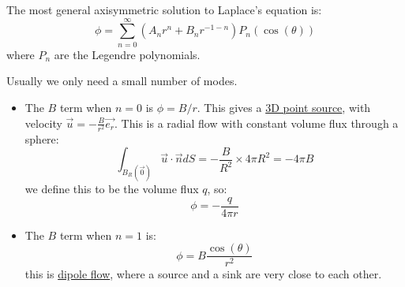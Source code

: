 \documentclass[../Main.tex]{subfiles}
\begin{document}
\begin{example}
    The most general axisymmetric solution to Laplace's equation is:
    \begin{equation*}
        \phi = \sum_{n=0}^{\infty} \left(A_n r^n + B_n r^{-1-n}\right) P_n(\cos(\theta))
    \end{equation*}
    where $P_n$ are the Legendre polynomials.

    Usually we only need a small number of modes.
    \begin{itemize}
        \item The $B$ term when $n = 0$ is $\phi = B / r$. This gives a \underline{3D point source}, with velocity $\vec{u} = -\frac{B}{r^2} \vec{e_r}$. This is a radial flow with constant volume flux through a sphere:
            \begin{equation*}
                \int_{B_R(\vec0)} \vec{u} \cdot \vec{n} dS = -\frac{B}{R^2} \times 4\pi R^2 = -4\pi B
            \end{equation*}
            we define this to be the volume flux $q$, so:
            \begin{equation*}
                \phi = -\frac{q}{4\pi r}
            \end{equation*}
        \item The $B$ term when $n = 1$ is:
            \begin{equation*}
                \phi = B \frac{\cos(\theta)}{r^2}
            \end{equation*}
            this is \underline{dipole flow}, where a source and a sink are very close to each other.
    \end{itemize}
\end{example}
\end{document}
